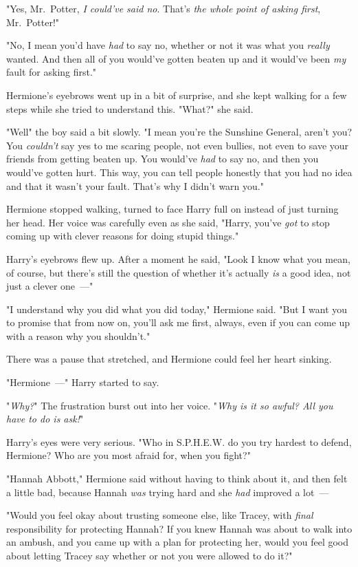 "Yes, Mr.~Potter, \emph{I could've said no}. That's \emph{the whole point of
asking first}, Mr.~Potter!"

"No, I mean you'd have \emph{had} to say no, whether or not it was what you
\emph{really} wanted. And then all of you would've gotten beaten up and it
would've been \emph{my} fault for asking first."

Hermione's eyebrows went up in a bit of surprise, and she kept walking for a
few steps while she tried to understand this. "What?" she said.

"Well{\el}" the boy said a bit slowly. "I mean{\el} you're the Sunshine
General, aren't you? You \emph{couldn't} say yes to me scaring people, not even
bullies, not even to save your friends from getting beaten up. You would've
\emph{had} to say no, and then you would've gotten hurt. This way, you can tell
people honestly that you had no idea and that it wasn't your fault. That's why
I didn't warn you."

Hermione stopped walking, turned to face Harry full on instead of just turning
her head. Her voice was carefully even as she said, "Harry, you've \emph{got}
to stop coming up with clever reasons for doing stupid things."

Harry's eyebrows flew up. After a moment he said, "Look{\el} I know what you
mean, of course, but there's still the question of whether it's actually
\emph{is} a good idea, not just a clever one~---"

"I understand why you did what you did today," Hermione said. "But I want you
to promise that from now on, you'll ask me first, always, even if you can come
up with a reason why you shouldn't."

There was a pause that stretched, and Hermione could feel her heart sinking.

"Hermione~---" Harry started to say.

"\emph{Why?}" The frustration burst out into her voice. "\emph{Why is it so
awful? All you have to do is ask!}"

Harry's eyes were very serious. "Who in S.P.H.E.W. do you try hardest to
defend, Hermione? Who are you most afraid for, when you fight?"

"Hannah Abbott," Hermione said without having to think about it, and then felt
a little bad, because Hannah \emph{was} trying hard and she \emph{had} improved
a lot~---

"Would you feel okay about trusting someone else, like Tracey, with
\emph{final} responsibility for protecting Hannah? If you knew Hannah was about
to walk into an ambush, and you came up with a plan for protecting her, would
you feel good about letting Tracey say whether or not you were allowed to do
it?"

